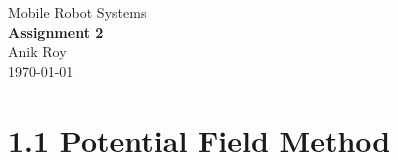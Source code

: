 \documentclass[12pt,a4paper]{article}
\begin{document}
\vfil

\begin{center}
	{\Large Mobile Robot Systems} \\
	\vspace{0.4in}
	{\huge \bf Assignment 2} \\
	\vspace{0.4in}
	{\large Anik Roy} \\
	\vspace{0.1in}
	{\large \today} \\
\end{center}
\vspace{0.4in}


\section*{1.1 Potential Field Method}
\end{document}
